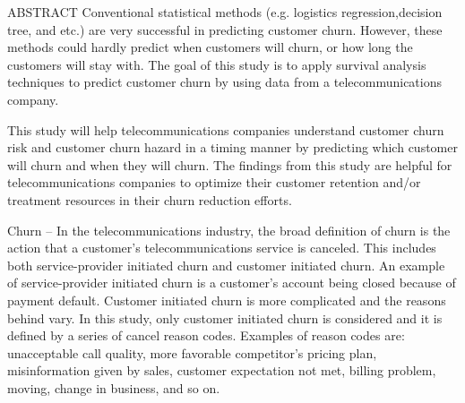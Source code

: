 

ABSTRACT
Conventional statistical methods (e.g. logistics regression,decision tree, and etc.) are very successful in predicting customer churn. However, these methods could hardly
predict when customers will churn, or how long the customers will stay with. The goal of this study is to apply survival analysis techniques to predict customer churn by using data from a telecommunications company.

This study will help telecommunications companies understand customer churn risk and customer churn
hazard in a timing manner by predicting which customer will churn and when they will churn. The findings from
this study are helpful for telecommunications companies to optimize their customer retention and/or treatment
resources in their churn reduction efforts.

Churn – In the telecommunications industry, the broad definition of churn is the action that a customer’s telecommunications service is canceled. This includes both service-provider initiated churn and customer
initiated churn. An example of service-provider initiated
churn is a customer’s account being closed because of
payment default. Customer initiated churn is more
complicated and the reasons behind vary. In this study, only customer initiated churn is considered and it is
defined by a series of cancel reason codes. Examples of reason codes are: unacceptable call quality, more
favorable competitor’s pricing plan, misinformation given
by sales, customer expectation not met, billing problem,
moving, change in business, and so on.
